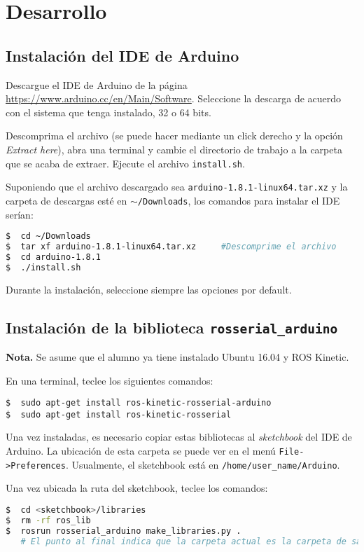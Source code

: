 \documentclass[a4paper,12pt]{article}
\begin{document}
\section{Desarrollo}
\subsection{Instalación del IDE de Arduino}

Descargue el IDE de Arduino de la página \url{https://www.arduino.cc/en/Main/Software}. Seleccione la descarga de acuerdo con el sistema que tenga instalado, 32 o 64 bits. 

Descomprima el archivo (se puede hacer mediante un click derecho y la opción \textit{Extract here}), abra una terminal y cambie el directorio de trabajo a la carpeta que se acaba de extraer. Ejecute el archivo \texttt{install.sh}.

Suponiendo que el archivo descargado sea \texttt{arduino-1.8.1-linux64.tar.xz} y la carpeta de descargas esté en \texttt{$\sim$/Downloads}, los comandos para instalar el IDE serían:
\begin{lstlisting}[language=bash]
$  cd ~/Downloads      
$  tar xf arduino-1.8.1-linux64.tar.xz     #Descomprime el archivo
$  cd arduino-1.8.1
$  ./install.sh
\end{lstlisting}

Durante la instalación, seleccione siempre las opciones por default. 

\subsection{Instalación de la biblioteca \texttt{rosserial\_arduino}}
\textbf{Nota.} Se asume que el alumno ya tiene instalado Ubuntu 16.04 y ROS Kinetic. 

En una terminal, teclee los siguientes comandos:
\begin{lstlisting}
$  sudo apt-get install ros-kinetic-rosserial-arduino
$  sudo apt-get install ros-kinetic-rosserial
\end{lstlisting}

Una vez instaladas, es necesario copiar estas bibliotecas al \textit{sketchbook} del IDE de Arduino. La ubicación de esta carpeta se puede ver en el menú \texttt{File->Preferences}. Usualmente, el sketchbook está en \texttt{/home/user\_name/Arduino}. 

Una vez ubicada la ruta del sketchbook, teclee los comandos:
\begin{lstlisting}[language=bash]
$  cd <sketchbook>/libraries
$  rm -rf ros_lib
$  rosrun rosserial_arduino make_libraries.py .
   # El punto al final indica que la carpeta actual es la carpeta de salida.
\end{lstlisting}
\end{document}
